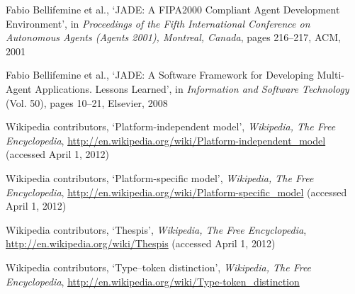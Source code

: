 \begin{thebibliography}{99}
Fabio Bellifemine et al., %
`JADE: A FIPA2000 Compliant Agent Development Environment',
in \textit{Proceedings of the Fifth International Conference on Autonomous Agents (Agents 2001), Montreal, Canada},
pages 216--217,
ACM, 2001

Fabio Bellifemine et al., %
`JADE: A Software Framework for Developing Multi-Agent Applications. Lessons Learned',
in \textit{Information and Software Technology} (Vol. 50),
pages 10--21,
Elsevier, 2008


Wikipedia contributors,
`Platform-independent model',
\textit{Wikipedia, The Free Encyclopedia},
\url{http://en.wikipedia.org/wiki/Platform-independent_model} (accessed April 1, 2012)

Wikipedia contributors,
`Platform-specific model',
\textit{Wikipedia, The Free Encyclopedia},
\url{http://en.wikipedia.org/wiki/Platform-specific_model} (accessed April 1, 2012)

Wikipedia contributors,
`Thespis',
\textit{Wikipedia, The Free Encyclopedia},
\url{http://en.wikipedia.org/wiki/Thespis} (accessed April 1, 2012)

Wikipedia contributors,
`Type–token distinction',
\textit{Wikipedia, The Free Encyclopedia},
\url{http://en.wikipedia.org/wiki/Type-token\_distinction}

\end{thebibliography}
